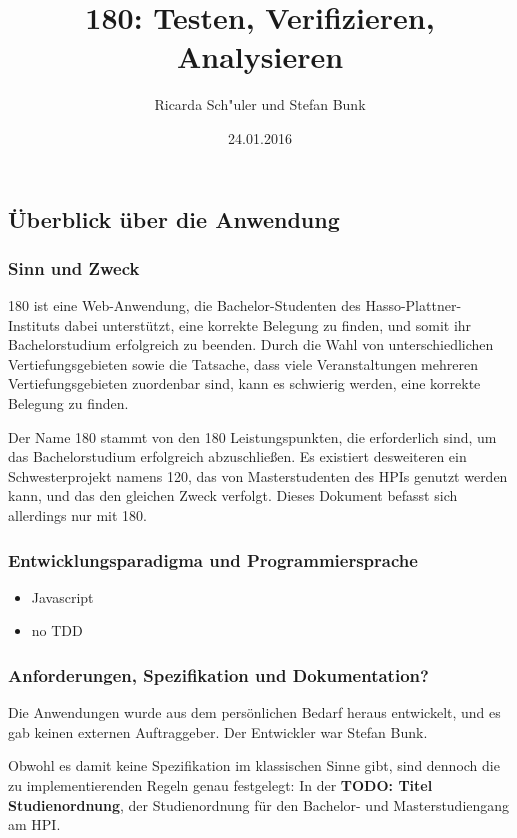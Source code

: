 \documentclass[ngerman]{article}
\title{180: Testen, Verifizieren, Analysieren}
\author{Ricarda Sch"uler und Stefan Bunk}
\date{24.01.2016}
\begin{document}
\subsection{Überblick über die Anwendung}
\label{sec:ueberblick}

\subsubsection{Sinn und Zweck}\label{sinn-und-zweck}

180 ist eine Web-Anwendung, die Bachelor-Studenten des
Hasso-Plattner-Instituts dabei unterstützt, eine korrekte Belegung zu
finden, und somit ihr Bachelorstudium erfolgreich zu beenden. Durch die
Wahl von unterschiedlichen Vertiefungsgebieten sowie die Tatsache, dass
viele Veranstaltungen mehreren Vertiefungsgebieten zuordenbar sind, kann
es schwierig werden, eine korrekte Belegung zu finden.

Der Name 180 stammt von den 180 Leistungspunkten, die erforderlich sind,
um das Bachelorstudium erfolgreich abzuschließen. Es existiert
desweiteren ein Schwesterprojekt namens 120, das von Masterstudenten des
HPIs genutzt werden kann, und das den gleichen Zweck verfolgt. Dieses
Dokument befasst sich allerdings nur mit 180.

\subsubsection{Entwicklungsparadigma und
Programmiersprache}\label{entwicklungsparadigma-und-programmiersprache}

\begin{itemize}
\itemsep1pt\parskip0pt
\item
  Javascript
\item
  no TDD
\end{itemize}

\subsubsection{Anforderungen, Spezifikation und
Dokumentation?}\label{anforderungen-spezifikation-und-dokumentation}

Die Anwendungen wurde aus dem persönlichen Bedarf heraus entwickelt, und
es gab keinen externen Auftraggeber. Der Entwickler war Stefan Bunk.

Obwohl es damit keine Spezifikation im klassischen Sinne gibt, sind
dennoch die zu implementierenden Regeln genau festgelegt: In der
\textbf{TODO: Titel Studienordnung}, der Studienordnung für den
Bachelor- und Masterstudiengang am HPI.
\end{document}
